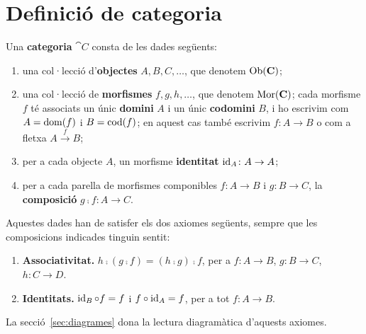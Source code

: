 \section{Definició de categoria}

\begin{definicio}
\label{def:categoria}
Una \textbf{categoria} $\cat{C}$ consta de les dades següents:
\begin{enumerate}
\item una col·lecció d'\textbf{objectes} $A,B,C,\dots$, que denotem $\operatorname{Ob}(\mathbf{C})$;
\item una col·lecció de \textbf{morfismes} $f,g,h,\dots$, que denotem $\operatorname{Mor}(\mathbf{C})$; cada morfisme $f$ té associats un únic \textbf{domini} $A$ i un únic \textbf{codomini} $B$, i ho escrivim com $A=\operatorname{dom}(f)$ i $B=\operatorname{cod}(f)$; en aquest cas també escrivim $f\colon A\to B$ o com a fletxa $A\xrightarrow{f}B$;
\item per a cada objecte $A$, un morfisme \textbf{identitat} $\operatorname{id}_A\colon A\to A$;
\item per a cada parella de morfismes componibles $f\colon A\to B$ i $g\colon B\to C$, la \textbf{composició} $g\comp f\colon A\to C$.
\end{enumerate}
Aquestes dades han de satisfer els dos axiomes següents, sempre que les composicions indicades tinguin sentit:
\begin{enumerate}
\item \textbf{Associativitat.} $h\comp(g\comp f)=(h\comp g)\comp f$, per a $f\colon A\to B$, $g\colon B\to C$, $h\colon C\to D$.
\item \textbf{Identitats.} $\operatorname{id}_B\circ f=f$ i $f\circ\operatorname{id}_A=f$, per a tot $f\colon A\to B$.
\end{enumerate}
La secció~\ref{sec:diagrames} dona la lectura diagramàtica d'aquests axiomes.
\end{definicio}

